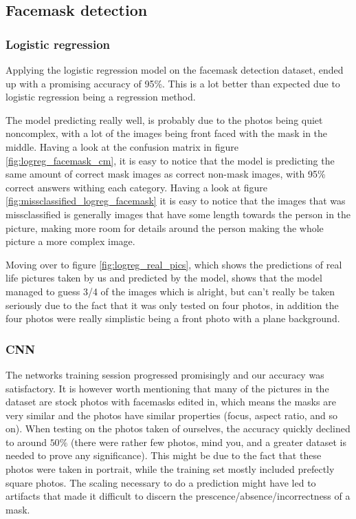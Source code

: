 \documentclass[../main.tex]{subfiles}
\begin{document}
\subsection{Facemask detection}
\subsubsection{Logistic regression}
Applying the logistic regression model on the facemask detection dataset, ended up with a promising accuracy of 95\%. This is a lot better than expected due to logistic regression being a regression method. 

The model predicting really well, is probably due to the photos being quiet noncomplex, with a lot of the images being front faced with the mask in the middle. Having a look at the confusion matrix in figure \ref{fig:logreg_facemask_cm}, it is easy to notice that the model is predicting the same amount of correct mask images as correct non-mask images, with 95\% correct answers withing each category. Having a look at figure \ref{fig:missclassified_logreg_facemask} it is easy to notice that the images that was missclassified is generally images that have some length towards the person in the picture, making more room for details around the person making the whole picture a more complex image.

Moving over to figure \ref{fig:logreg_real_pics}, which shows the predictions of real life pictures taken by us and predicted by the model, shows that the model managed to guess 3/4 of the images which is alright, but can't really be taken seriously due to the fact that it was only tested on four photos, in addition the four photos were really simplistic being a front photo with a plane background.


\subsubsection{CNN}
The networks training session progressed promisingly and our accuracy was satisfactory. It is however worth mentioning that many of the pictures in the dataset are stock photos with facemasks edited in, which means the masks are very similar and the photos have similar properties (focus, aspect ratio, and so on). When testing on the photos taken of ourselves, the accuracy quickly declined to around $50\%$ (there were rather few photos, mind you, and a greater dataset is needed to prove any significance). This might be due to the fact that these photos were taken in portrait, while the training set mostly included prefectly square photos. The scaling necessary to do a prediction might have led to artifacts that made it difficult to discern the prescence/absence/incorrectness of a mask.
\end{document}
